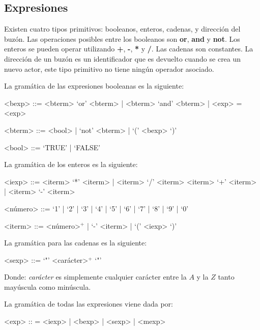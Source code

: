 \subsection{Expresiones}\label{actores:exp}
Existen cuatro tipos primitivos: booleanos, enteros, cadenas, y dirección del buzón. Las operaciones posibles entre los booleanos son \textbf{or}, \textbf{and} y \textbf{not}. Los enteros se pueden operar utilizando \textbf{+}, \textbf{-}, \textbf{*} y \textbf{/}. Las cadenas son constantes. La dirección de un buzón es un identificador que es devuelto cuando se crea un nuevo actor, este tipo primitivo no tiene ningún operador asociado.

La gramática de las expresiones booleanas es la siguiente:

\begin{grammar}

<bexp> ::= <bterm> `or' <bterm> | <bterm> `and' <bterm> | <exp> = <exp>
  
<bterm> ::= <bool> | `not' <bterm> | `(' <bexp> `)' 

<bool> ::= `TRUE' | `FALSE'

\end{grammar}

La gramática de los enteros es la siguiente:

\begin{grammar}

<iexp> ::= <iterm> `*' <iterm> | <iterm> `/' <iterm> 
\alt <iterm> `+' <iterm>  | <iterm> `-' <iterm>

<número> ::= `1' | `2' | `3' | `4' | `5' | `6' | `7' | `8' | `9' | `0'

<iterm> ::= <número>$^{+}$ | `-' <iterm> | `(' <iexp> `)'

\end{grammar}

La gramática para las cadenas es la siguiente:

\begin{grammar}
 <sexp> ::= `"' <carácter>$^{+}$ `"'
\end{grammar}

Donde: \textit{carácter} es simplemente cualquier carácter entre la $A$ y la $Z$ tanto mayúscula como minúscula.

La gramática de todas las expresiones viene dada por:

\begin{grammar}
<exp> :: = <iexp> | <bexp> | <sexp> | <mexp>  
\end{grammar}

